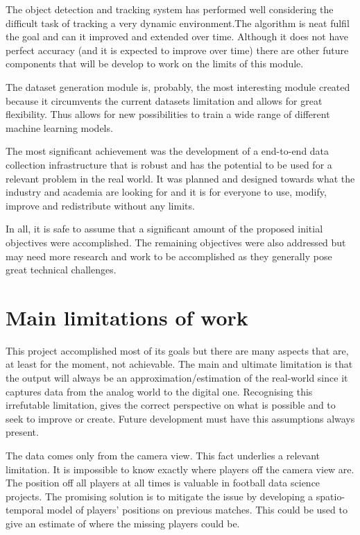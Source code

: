 \documentclass[
    11pt,
    oneside
]{report}
\begin{document}
The object detection and tracking system has performed well considering the difficult task of tracking a very dynamic environment.The algorithm is neat fulfil the goal and can it improved and extended over time. Although it does not have perfect accuracy (and it is expected to improve over time) there are other future components that will be develop to work on the limits of this module.


The dataset generation module is, probably, the most interesting module created because it circumvents the current datasets limitation and allows for great flexibility. Thus allows for new possibilities to train a wide range of different machine learning models.


The most significant achievement was the development of a end-to-end data collection infrastructure that is robust and has the potential to be used for a relevant problem in the real world. It was planned and designed towards what the industry and academia are looking for and it is for everyone to use, modify, improve and redistribute without any limits.


In all, it is safe to assume that a significant amount of the proposed initial objectives were accomplished. The remaining objectives were also addressed but may need more research and work to be accomplished as they generally pose great technical challenges.


\section{Main limitations of work}


This project accomplished most of its goals but there are many aspects that are, at least for the moment, not achievable. The main and ultimate limitation is that the output will always be an approximation/estimation of the real-world since it captures data from the analog world to the digital one. Recognising this irrefutable limitation, gives the correct perspective on what is possible and to seek to improve or create. Future development must have this assumptions always present.


The data comes only from the camera view. This fact underlies a relevant limitation. It is impossible to know exactly where players off the camera view are. The position off all players at all times is valuable in football data science projects. The promising solution is to mitigate the issue by developing a spatio-temporal model of players' positions on previous matches. This could be used to give an estimate of where the missing players could be.
\end{document}
